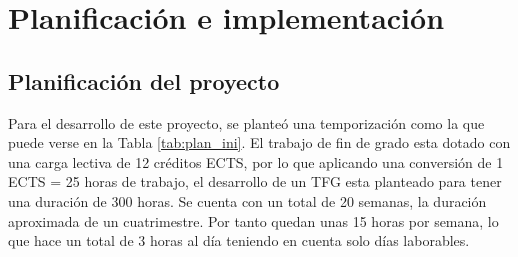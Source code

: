 \chapter{Planificación e implementación}
\label{chap:planyimpl}

\section{Planificación del proyecto}

Para el desarrollo de este proyecto, se planteó una temporización como la que puede verse en la Tabla \ref{tab:plan_ini}. El trabajo de fin de grado esta dotado con una carga lectiva de 12 créditos ECTS, por lo que aplicando una conversión de 1 ECTS = 25 horas de trabajo, el desarrollo de un TFG esta planteado para tener una duración de 300 horas. Se cuenta con un total de 20 semanas, la duración aproximada de un cuatrimestre. Por tanto quedan unas 15 horas por semana, lo que hace un total de 3 horas al día teniendo en cuenta solo días laborables.

